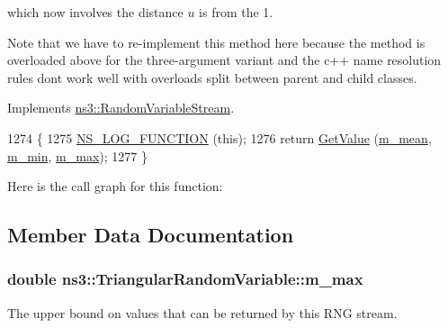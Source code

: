 which now involves the distance $u$ is from the 1.

Note that we have to re-\/implement this method here because the method is overloaded above for the three-\/argument variant and the c++ name resolution rules don\textquotesingle{}t work well with overloads split between parent and child classes. 

Implements \hyperlink{classns3_1_1RandomVariableStream_a4fa5944dc4cb11544e661ed23072b36c}{ns3\+::\+Random\+Variable\+Stream}.


\begin{DoxyCode}
1274 \{
1275   \hyperlink{log-macros-disabled_8h_a90b90d5bad1f39cb1b64923ea94c0761}{NS\_LOG\_FUNCTION} (\textcolor{keyword}{this});
1276   \textcolor{keywordflow}{return} \hyperlink{classns3_1_1TriangularRandomVariable_a2d61dfce4b5be840c57aa1aea655e3c1}{GetValue} (\hyperlink{classns3_1_1TriangularRandomVariable_a9c1b9e0f4bf53d8277fdb76275df731a}{m\_mean}, \hyperlink{classns3_1_1TriangularRandomVariable_acd78d6af1b19000d64c22fd2aba49493}{m\_min}, \hyperlink{classns3_1_1TriangularRandomVariable_aa1a7f68942d3aefa85414784e0071244}{m\_max});
1277 \}
\end{DoxyCode}


Here is the call graph for this function\+:




\subsection{Member Data Documentation}
\subsubsection[{\texorpdfstring{m\+\_\+max}{m_max}}]{\setlength{\rightskip}{0pt plus 5cm}double ns3\+::\+Triangular\+Random\+Variable\+::m\+\_\+max\hspace{0.3cm}{\ttfamily [private]}}\hypertarget{classns3_1_1TriangularRandomVariable_aa1a7f68942d3aefa85414784e0071244}{}\label{classns3_1_1TriangularRandomVariable_aa1a7f68942d3aefa85414784e0071244}
The upper bound on values that can be returned by this R\+NG stream. 
